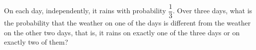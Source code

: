 On each day, independently, it rains with probability $\dfrac13$. Over three days, what is the probability that the weather on one of the days is different from the weather on the other two days, that is, it rains on exactly one of the three days or on exactly two of them?
